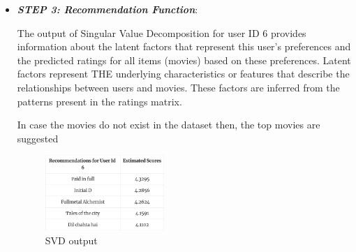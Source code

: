 \documentclass[a4paper,10pt]{article}
\begin{document}
\begin{enumerate}
\begin{itemize}
  

\item \textbf{\textit{STEP 3: Recommendation Function}}:
  
    The output of Singular Value Decomposition for user ID 6 provides information about the latent factors that represent this user's preferences and the predicted ratings for all items (movies) based on these preferences. Latent factors represent THE underlying characteristics or features that describe the relationships between users and movies. These factors are inferred from the patterns present in the ratings matrix.

    
    In case the movies do not exist in the dataset then, the top movies are suggested
\begin{figure} [H]
    \centering
    \includegraphics[width=4.5cm]{figures/svd_output.png}
    \caption{SVD output}
    \label{svd}
\end{figure}


\end{itemize}
\end{enumerate}
\end{document}
